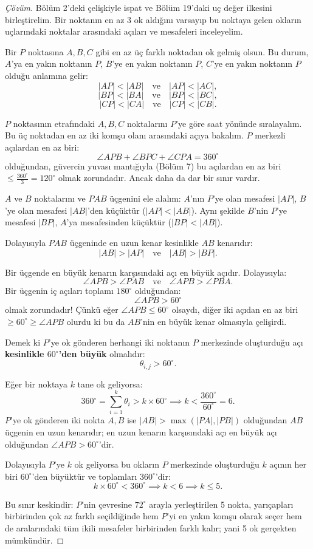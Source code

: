 \begin{proof}[Çözüm]
Bölüm 2'deki çelişkiyle ispat ve Bölüm 19'daki uç değer ilkesini birleştirelim. Bir noktanın en az 3 ok aldığını varsayıp bu noktaya gelen okların uçlarındaki noktalar arasındaki açıları ve mesafeleri inceleyelim.

Bir $P$ noktasına $A, B, C$ gibi en az üç farklı noktadan ok gelmiş olsun.
Bu durum, $A$'ya en yakın noktanın $P$, $B$'ye en yakın noktanın $P$, $C$'ye en yakın noktanın $P$ olduğu anlamına gelir:
\[
|AP| < |AB| \quad \text{ve} \quad |AP| < |AC|,
\]
\[
|BP| < |BA| \quad \text{ve} \quad |BP| < |BC|,
\]
\[
|CP| < |CA| \quad \text{ve} \quad |CP| < |CB|.
\]

$P$ noktasının etrafındaki $A, B, C$ noktalarını $P$'ye göre saat yönünde sıralayalım. Bu üç noktadan en az iki komşu olanı arasındaki açıya bakalım. $P$ merkezli açılardan en az biri:
\[
\angle APB + \angle BPC + \angle CPA = 360^\circ
\]
olduğundan, güvercin yuvası mantığıyla (Bölüm 7) bu açılardan en az biri $\le \frac{360^\circ}{3} = 120^\circ$ olmak zorundadır. Ancak daha da dar bir sınır vardır.

$A$ ve $B$ noktalarını ve $PAB$ üçgenini ele alalım:
$A$'nın $P$'ye olan mesafesi $|AP|$, $B$'ye olan mesafesi $|AB|$'den küçüktür ($|AP| < |AB|$).
Aynı şekilde $B$'nin $P$'ye mesafesi $|BP|$, $A$'ya mesafesinden küçüktür ($|BP| < |AB|$).

Dolayısıyla $PAB$ üçgeninde en uzun kenar kesinlikle $AB$ kenarıdır:
\[
|AB| > |AP| \quad \text{ve} \quad |AB| > |BP|.
\]

Bir üçgende en büyük kenarın karşısındaki açı en büyük açıdır. Dolayısıyla:
\[
\angle APB > \angle PAB \quad \text{ve} \quad \angle APB > \angle PBA.
\]
Bir üçgenin iç açıları toplamı $180^\circ$ olduğundan:
\[
\angle APB > 60^\circ
\]
olmak zorundadır! Çünkü eğer $\angle APB \le 60^\circ$ olsaydı, diğer iki açıdan en az biri $\ge 60^\circ \ge \angle APB$ olurdu ki bu da $AB$'nin en büyük kenar olmasıyla çelişirdi.

Demek ki $P$'ye ok gönderen herhangi iki noktanın $P$ merkezinde oluşturduğu açı \textbf{kesinlikle $60^\circ$'den büyük} olmalıdır:
\[
\theta_{i,j} > 60^\circ.
\]

Eğer bir noktaya $k$ tane ok geliyorsa:
\[
360^\circ = \sum_{i=1}^k \theta_i > k \times 60^\circ \implies k < \frac{360^\circ}{60^\circ} = 6.
\]
$P$'ye ok gönderen iki nokta $A, B$ ise $|AB| > \max(|PA|, |PB|)$ olduğundan $AB$ üçgenin en uzun kenarıdır; en uzun kenarın karşısındaki açı en büyük açı olduğundan $\angle APB > 60^\circ$'dir.

Dolayısıyla $P$'ye $k$ ok geliyorsa bu okların $P$ merkezinde oluşturduğu $k$ açının her biri $60^\circ$'den büyüktür ve toplamları $360^\circ$'dir:
\[
k \times 60^\circ < 360^\circ \implies k < 6 \implies k \le 5.
\]

Bu sınır keskindir: $P$'nin çevresine $72^\circ$ arayla yerleştirilen 5 nokta, yarıçapları birbirinden çok az farklı seçildiğinde hem $P$'yi en yakın komşu olarak seçer hem de aralarındaki tüm ikili mesafeler birbirinden farklı kalır; yani 5 ok gerçekten mümkündür.
\end{proof}

